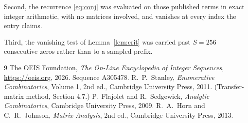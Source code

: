\documentclass[11pt,a4paper]{article}
\theoremstyle{plain}
\theoremstyle{definition}
\begin{document}
Second, the recurrence \eqref{eq:conj} was evaluated on those published terms in exact
integer arithmetic, with no matrices involved, and vanishes at every index the entry claims.

Third, the vanishing test of Lemma~\ref{lem:crit} was carried past $S=256$ consecutive
zeros rather than to a sampled prefix.

\begin{thebibliography}{9}
 The OEIS Foundation, \emph{The On-Line Encyclopedia of Integer
Sequences}, \url{https://oeis.org}, 2026. Sequence A305478.
 R.~P.~Stanley, \emph{Enumerative Combinatorics}, Volume 1, 2nd ed.,
Cambridge University Press, 2011. (Transfer-matrix method, Section 4.7.)
 P.~Flajolet and R.~Sedgewick, \emph{Analytic Combinatorics}, Cambridge
University Press, 2009.
 R.~A.~Horn and C.~R.~Johnson, \emph{Matrix Analysis}, 2nd ed., Cambridge
University Press, 2013.
\end{thebibliography}
\end{document}
